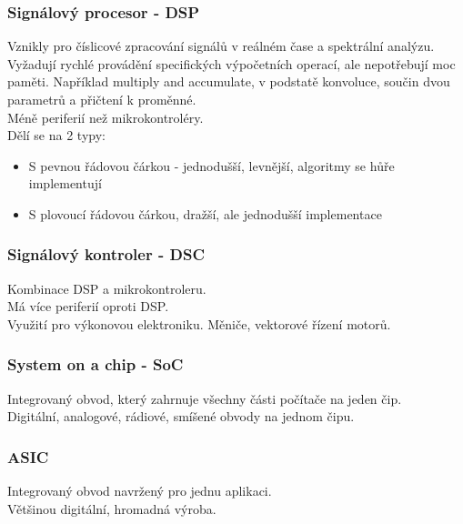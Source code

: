 \subsubsection*{Signálový procesor - DSP}
Vznikly pro číslicové zpracování signálů v reálném čase a spektrální analýzu. \\
Vyžadují rychlé provádění specifických výpočetních operací, ale nepotřebují moc paměti. Například multiply and accumulate, v podstatě konvoluce, součin dvou parametrů a přičtení k proměnné.\\
Méně periferií než mikrokontroléry. \\
Dělí se na 2 typy:
\begin{itemize}
    \item S pevnou řádovou čárkou - jednodušší, levnější, algoritmy se hůře implementují
    \item S plovoucí řádovou čárkou, dražší, ale jednodušší implementace
\end{itemize}

\subsubsection*{Signálový kontroler - DSC}
Kombinace DSP a mikrokontroleru.\\
Má více periferií oproti DSP. \\
Využití pro výkonovou elektroniku. Měniče, vektorové řízení motorů.\\

\subsubsection*{System on a chip - SoC}
Integrovaný obvod, který zahrnuje všechny části počítače na jeden čip. \\
Digitální, analogové, rádiové, smíšené obvody na jednom čipu. \\

\subsubsection*{ASIC}
Integrovaný obvod navržený pro jednu aplikaci.\\
Většinou digitální, hromadná výroba.\\